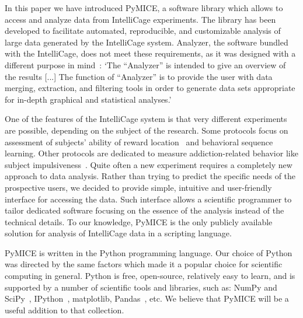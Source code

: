 In this paper we have introduced PyMICE, a software library which allows to access
and analyze data from IntelliCage experiments.
%
The library has been developed to
facilitate automated, reproducible, and customizable analysis of large data
generated by the IntelliCage system. Analyzer, the software bundled with the
IntelliCage, does not meet these requirements, as it was designed with a
different purpose in mind~\cite{intelliCagePlusManual2011}:
`The ``Analyzer'' is intended to give an overview of the results [...]
The function of ``Analyzer'' is to provide the user with data merging,
extraction, and filtering tools in order to generate data sets appropriate for
in-depth graphical and statistical analyses.'

One of the features of the IntelliCage system is that very different
experiments are possible, depending on the subject of the research.
Some protocols focus on assessment of subjects' ability of reward
location~\cite{Knapska:2013dj} and behavioral sequence~\cite{Endo:2011bs}
learning. Other protocols are dedicated to measure addiction-related
behavior like subject impulsiveness~\cite{Radwanska:2012fd,Mijakowska:2015io}.
Quite often a new experiment requires a
completely new approach to data analysis. Rather than trying to predict the
specific needs of the prospective users, we decided to provide simple,
intuitive and user-friendly interface for accessing the data. Such interface
allows a scientific programmer to tailor dedicated software focusing on the
essence of the analysis instead of the technical details. To our knowledge,
PyMICE is the only publicly available solution for analysis of IntelliCage
data in a scripting language.

PyMICE is written in the Python programming language. Our choice of Python
was directed by the same factors
which made it a popular choice for scientific computing in general.
Python is free,
open-source, relatively easy to learn, and is supported by a number of
scientific tools and libraries, such as: NumPy and SciPy~\cite{Oliphant:2007ud},
IPython~\cite{Perez:2007wf}, matplotlib,
Pandas~\cite{mckinney-proc-scipy-2010}, etc.
We believe that PyMICE will be a useful addition to that collection.

